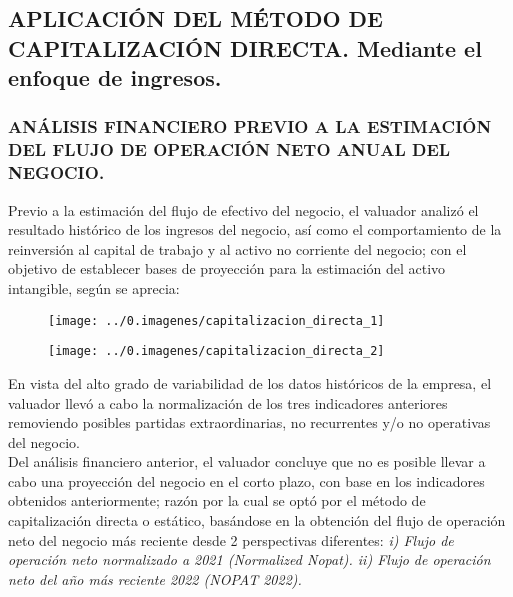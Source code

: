 \subsection{APLICACIÓN DEL MÉTODO DE CAPITALIZACIÓN DIRECTA. Mediante el enfoque de ingresos.} 

\subsubsection*{ANÁLISIS FINANCIERO PREVIO A LA ESTIMACIÓN DEL FLUJO DE OPERACIÓN NETO ANUAL DEL NEGOCIO.} 

Previo a la estimación del flujo de efectivo del negocio, el valuador analizó el resultado histórico de los ingresos del negocio, así como el comportamiento de la reinversión al capital de trabajo y al activo no corriente del negocio; con el objetivo de establecer bases de proyección para la estimación del activo intangible, según se aprecia:

\begin{figure}[H]
\centering
\texttt{[image: ../0.imagenes/capitalizacion\_directa\_1]}
\end{figure}

\begin{figure}[H]
\centering
\texttt{[image: ../0.imagenes/capitalizacion\_directa\_2]}
\end{figure}

En vista del alto grado de variabilidad de los datos históricos de la empresa, el valuador llevó a cabo la normalización de los tres indicadores anteriores removiendo posibles partidas extraordinarias, no recurrentes y/o no operativas del negocio.\\

Del análisis financiero anterior, el valuador concluye que no es posible llevar a cabo una proyección del negocio en el corto plazo, con base en los indicadores obtenidos anteriormente; razón por la cual se optó por el método de capitalización directa o estático, basándose en la obtención del flujo de operación neto del negocio más reciente desde 2 perspectivas diferentes: \textit{i) Flujo de operación neto normalizado a 2021 (Normalized Nopat). ii) Flujo de operación neto del año más reciente 2022 (NOPAT 2022).}

